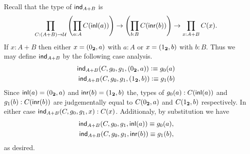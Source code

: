 \documentclass[12pt]{book}
\begin{document}
Recall that the type of \(\mathsf{ind}_{A+B}\) is 
\[\prod_{C:(A+B) \rightarrow \mathcal{U}} \left(\prod_{a:A}C({\mathsf{inl}}(a))\right) \rightarrow \left(\prod_{b:B}C({\mathsf{inr}}(b))\right) \rightarrow \prod_{x:A+B}C(x).\]
If \(x : A + B\) then either \(x = (0_\mathbf{2} , a)\) with \(a : A\) or \(x = (1_\mathbf{2}, b)\) with \(b : B\). Thus we may define \(\mathsf{ind}_{A+B}\) by the following case analysis.
\begin{align*}
\mathsf{ind}_{A+B}(C,g_0,g_1,(0_\mathbf{2},a)) \vcentcolon\equiv g_0(a)\\
\mathsf{ind}_{A+B}(C,g_0,g_1,(1_\mathbf{2},b)) \vcentcolon\equiv g_1(b)
\end{align*}
Since \({\mathsf{inl}}(a) = (0_\mathbf{2},a)\) and \({\mathsf{inr}}(b) = (1_\mathbf{2},b)\) the, types of \(g_0(a) : C ({\mathsf{inl}}(a))\) and \(g_1(b) : C ({\mathsf{inr}}(b))\) are judgementally equal to  \(C (0_\mathbf{2},a)\) and \(C (1_\mathbf{2},b)\) respectively. In either case \(\mathsf{ind}_{A+B}(C,g_0,g_1,x) : C(x)\). Additionaly, by substitution we have
\begin{align*}
\mathsf{ind}_{A+B}(C, g_0,g_1,{\mathsf{inl}}(a)) \equiv g_0(a),\\
\mathsf{ind}_{A+B}(C, g_0,g_1,{\mathsf{inr}}(b)) \equiv g_1(b),
\end{align*}
as desired.
\end{document}
